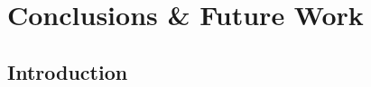 \def\ChapterTitle{Conclusions \& Future Work}

	\chapter{\ChapterTitle}
	\label{Chapter\thechapter}

\section{Introduction}
